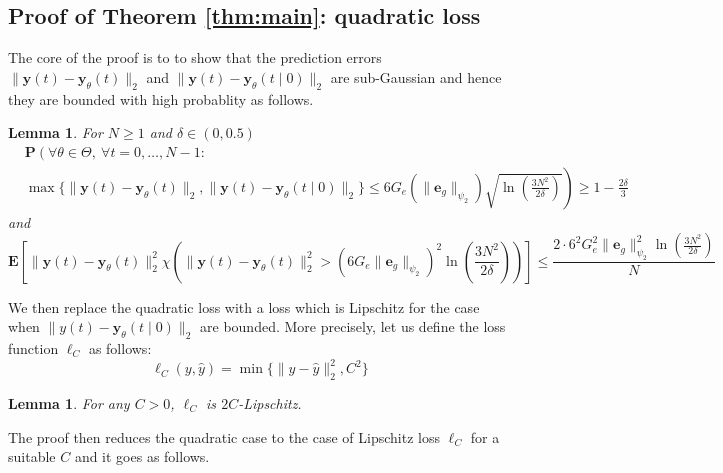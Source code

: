 \documentclass{article}
\newtheorem{lemma}[theorem]{Lemma}
\newcommand{\e}{\mathbf{e}}
\newcommand{\y}{\mathbf{y}}
\newcommand{\bP}{\mathbf{P}}
\newcommand{\bE}{\mathbf{E}}
\begin{document}
\subsection{Proof of Theorem \ref{thm:main}: quadratic loss}
\label{thm:main:quadratic}
  The core of the proof is to to show that the prediction errors
  $\|\y(t)-\y_{\theta}(t)\|_2$ and $\|\y(t) - \y_{\theta}(t\mid 0)\|_2$ 
  are sub-Gaussian and hence
  they are bounded with high probablity as follows.
  \begin{lemma}
  \label{lem:quadratic1}
  For $N \ge 1$ and $\delta \in (0,0.5)$
  \begin{equation}
\label{lem:quadratic1:eq1}
\begin{aligned}
     & \bP\left(\forall \theta \in \Theta,~  \forall t=0,\ldots, N-1: \quad 
     \right. \\
     & \left. 
          \max\{\|\y(t)-\y_{\theta}(t)\|_2, \|\y(t)-\y_{\theta}(t\mid 0)\|_2\} \le 6G_e (\|\e_g\|_{\psi_2})\sqrt{\ln\left(\frac{3N^2}{2\delta}\right)} \right) \ge 1-\frac{2\delta}{3}
\end{aligned}
  \end{equation}
  and 
  \begin{equation}
\label{lem:quadratic1:eq2}
   \bE[\|\y(t)-\y_{\theta}(t)\|_2^2 \chi(\|\y(t)-\y_{\theta}(t)\|_2^2 > (6G_e\|\e_g\|_{\psi_2})^2\ln\left(\frac{3N^2}{2\delta}\right))] \le 
   \frac{2 \cdot 6^2 G_e^2 \|\e_g\|_{\psi_2}^2\ln(\frac{3N^2}{2\delta})}{N}
\end{equation}
\end{lemma}
We then replace the quadratic loss with a loss which is Lipschitz for 
the case when $\|y(t)-\y_{\theta}(t\mid 0)\|_2$ are bounded. More precisely, let us define the loss function $\ell_C$ as follows:
\[ \ell_C(y, \hat{y}) = \min\{\|y-\hat{y}\|_2^2, C^2\} \]
\begin{lemma}
\label{lem:quadratic2}
For any $C > 0$, $\ell_C$ is $2C$-Lipschitz.
\end{lemma}
The proof then reduces the quadratic case to the case of Lipschitz loss $\ell_C$
for a suitable $C$ and it goes as follows.
\end{document}
